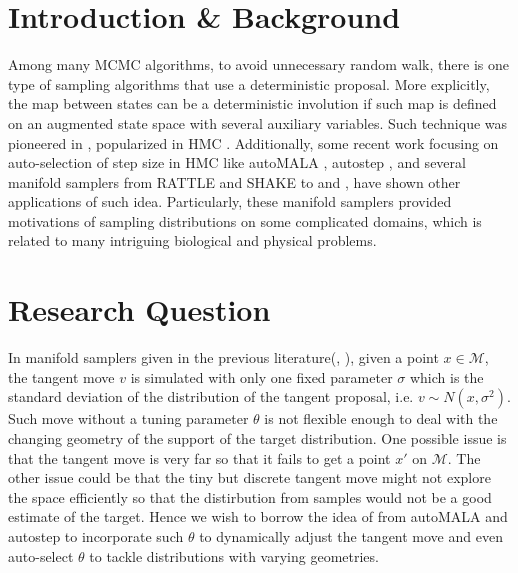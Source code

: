 \documentclass{article}
\begin{document}


\section{Introduction \& Background}
Among many MCMC algorithms, to avoid unnecessary random walk, there is one type of sampling algorithms that use a deterministic proposal. More explicitly, the map between states can be a deterministic involution if such map is defined on an augmented state space with several auxiliary variables. Such technique was pioneered in \cite{tierney1998}, popularized in HMC \cite{nealHMC}. Additionally, some recent work focusing on auto-selection of step size in HMC like autoMALA \cite{automala}, autostep \cite{autostep}, and several manifold samplers from RATTLE \cite{rattle} and SHAKE \cite{shake} to \cite{manifoldparent} and \cite{Lelievrehmc2019}, have shown other applications of such idea. Particularly, these manifold samplers provided motivations of sampling distributions on some complicated domains, which is related to many intriguing biological and physical problems.


\section{Research Question}
In manifold samplers given in the previous literature(\cite{rattle}, \cite{manifoldparent}), given a point $x \in \mathscr{M}$, the tangent move $v$ is simulated with only one fixed parameter $\sigma$ which is the standard deviation of the distribution of the tangent proposal, i.e. $v \sim N(x, \sigma^2)$. Such move without a tuning parameter $\theta$ is not flexible enough to deal with the changing geometry of the support of the target distribution. One possible issue is that the tangent move is very far so that it fails to get a point $x'$ on $\mathscr{M}$. The other issue could be that the tiny but discrete tangent move might not explore the space efficiently so that the distirbution from samples would not be a good estimate of the target. Hence we wish to borrow the idea of from autoMALA and autostep to incorporate such $\theta$ to dynamically adjust the tangent move and even auto-select $\theta$ to tackle distributions with varying geometries.

\end{document}
